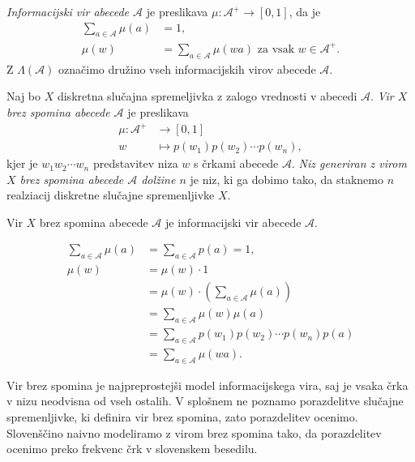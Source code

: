 \documentclass[fin1, tisk]{fmfdelo}
\newcommand{\A}{\mathcal{A}}
\theoremstyle{definition}
\begin{document}
\begin{definicija}
    \emph{Informacijski vir abecede $\A$} je preslikava $\mu \colon \A^+ \to [0,1]$, da je 
    \begin{align*}
        \sum_{a \in \A} \mu(a) &= 1, \\
        \mu(w) &= \sum_{a \in \A} \mu(wa) \text{ za vsak } w \in \A^+.
    \end{align*}
    Z $\Lambda(\A)$ označimo družino vseh informacijskih virov abecede $\A$.
\end{definicija}

\begin{definicija} %
    Naj bo $X$ diskretna slučajna spremeljivka z zalogo vrednosti v abecedi $\A$.
    \emph{Vir $X$ brez spomina abecede $\A$} je preslikava
    \begin{align*}
        \mu \colon \A^+ &\to [0,1] \\
        w &\mapsto p(w_1)p(w_2) \cdots p(w_n),
    \end{align*}
    kjer je $w_1w_2 \cdots w_n$ predstavitev niza $w$ s črkami abecede $\A$.
    \emph{Niz generiran z virom $X$ brez spomina abecede $\A$ dolžine $n$} je niz, ki 
    ga dobimo tako, da staknemo $n$ realziacij diskretne slučajne spremenljivke $X$.
\end{definicija}

\begin{trditev}
    Vir $X$ brez spomina abecede $\A$ je informacijski vir abecede $\A$.
\end{trditev}

\begin{dokaz}
    \begin{align*}
        \sum_{a \in \A} \mu(a) &= \sum_{a \in \A} p(a) = 1, \\
        \mu(w) &= \mu(w) \cdot 1 \\
        &= \mu(w) \cdot \left( \sum_{a \in \A} \mu(a) \right) \\
        &= \sum_{a \in \A} \mu(w)\mu(a) \\
        &= \sum_{a \in \A} p(w_1) p(w_2) \cdots p(w_n) p(a) \\
        &= \sum_{a \in \A} \mu(wa).
    \end{align*}
\end{dokaz}

Vir brez spomina je najpreprostejši model informacijskega vira, saj je vsaka črka v nizu neodvisna
od vseh ostalih. V splošnem ne poznamo porazdelitve slučajne spremenljivke, ki
definira vir brez spomina, zato porazdelitev ocenimo. Slovenščino naivno modeliramo z virom brez
spomina tako, da porazdelitev ocenimo preko frekvenc črk v slovenskem besedilu.
\end{document}
